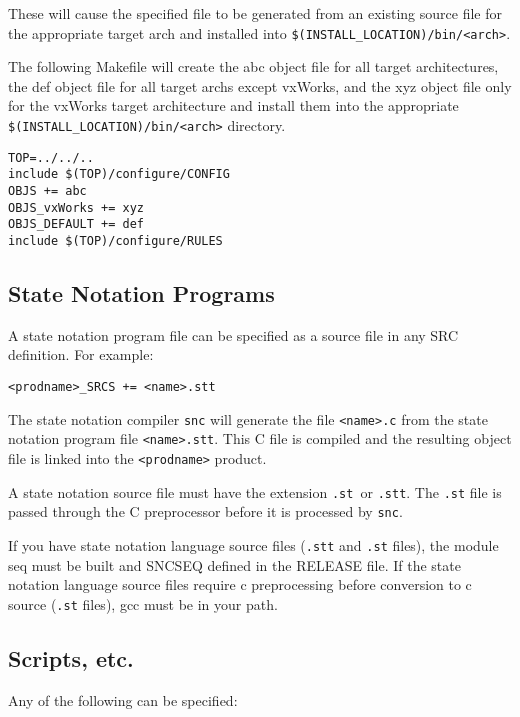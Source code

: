 These will cause the specified file to be generated from an existing source file for the appropriate target arch and installed 
into \verb|$(INSTALL_LOCATION)/bin/<arch>|.

The following Makefile will create the abc object file for all target architectures, the def object file for all target archs 
except vxWorks, and the xyz object file only for the vxWorks target architecture and install them into the appropriate 
\verb|$(INSTALL_LOCATION)/bin/<arch>| directory.

\begin{verbatim}
TOP=../../..
include $(TOP)/configure/CONFIG
OBJS += abc
OBJS_vxWorks += xyz
OBJS_DEFAULT += def
include $(TOP)/configure/RULES
\end{verbatim}

\subsection{State Notation Programs}

A state notation program file can be specified as a source file in any SRC definition. For example:

\begin{verbatim}
<prodname>_SRCS += <name>.stt
\end{verbatim}

The state notation compiler \verb|snc| will generate the file \verb|<name>.c| from the state notation program file \verb|<name>.stt|. 
This C file is compiled and the resulting object file is linked into the \verb|<prodname>| product.

A state notation source file must have the extension \verb|.st |or \verb|.stt|. The \verb|.st| file is passed through the C preprocessor 
before it is processed by \verb|snc|.

If you have state notation language source files (\verb|.stt| and \verb|.st| files),  the module seq must be built and SNCSEQ defined 
in the RELEASE file. If the state notation language source files require c preprocessing before conversion to c source 
(\verb|.st| files), gcc must be in your path.

\subsection{Scripts, etc.}

Any of the following can be specified:

